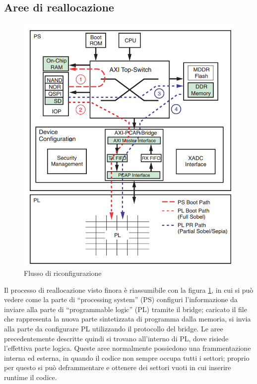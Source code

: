 \documentclass[11pt]{article} %
\begin{document}
\subsection{Aree di reallocazione}

\begin{figure}
\centering
\includegraphics[scale=0.5]{protocollo_riconfigurazione.png}
\caption{Flusso di riconfigurazione}\label{fig:2}
\end{figure}

Il processo di reallocazione visto finora è riassumibile con la figura \ref{fig:2}, in cui si può vedere come la parte di  ``processing system'' (PS) configuri l'informazione da inviare alla parte di ``programmable logic'' (PL) tramite il bridge; caricato il file che rappresenta la nuova parte sintetizzata di programma dalla memoria, si invia alla parte da configurare PL utilizzando il protocollo del bridge.
Le aree precedentemente descritte quindi si trovano all'interno di PL, dove risiede l'effettiva parte logica. Queste aree normalmente possiedono una frammentazione interna ed esterna, in quando il codice non sempre occupa tutti i settori; proprio per questo si può deframmentare e ottenere dei settori vuoti in cui inserire runtime il codice.
\end{document}
